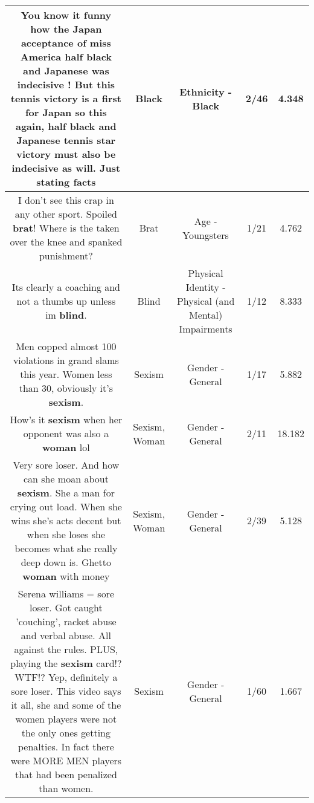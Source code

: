 \documentclass[11pt]{article}
\newlength\mylength
\begin{document}
\begin{center}
\begin{longtable}{|C{.65\mylength}|C{.30\mylength}|C{.12\mylength}|C{.12\mylength}|C{.12\mylength}|}
  \small You know it funny how the Japan acceptance of miss America half \textbf{black} and Japanese was indecisive ! But this tennis victory is a first for Japan so this again, half \textbf{black} and Japanese tennis star victory must also be indecisive as will. Just stating facts\normalsize   & Black & Ethnicity - Black & 2/46 & 4.348 \\  \hline
  \small I don't see this crap in any other sport.  Spoiled \textbf{brat}!  Where is the taken over the knee and spanked punishment?\normalsize   & Brat & Age - Youngsters & 1/21 & 4.762 \\  \hline
  \small Its clearly a coaching and not a thumbs up unless im \textbf{blind}.\normalsize   & Blind & Physical Identity - Physical (and Mental) Impairments & 1/12 & 8.333 \\  \hline
  \small Men copped almost 100 violations in grand slams this year. Women less than 30, obviously it's \textbf{sexism}.\normalsize   & Sexism & Gender - General & 1/17 & 5.882 \\  \hline
  \small How's it \textbf{sexism} when her opponent was also a \textbf{woman} lol\normalsize   & Sexism, Woman & Gender - General & 2/11 & 18.182 \\  \hline
  \small Very sore loser. And how can she moan about \textbf{sexism}. She a man for crying out load. When she wins she's acts decent but when she loses she becomes what she really deep down is. Ghetto \textbf{woman} with money\normalsize   & Sexism, Woman & Gender - General & 2/39 & 5.128 \\  \hline
  \small Serena williams = sore loser. Got caught 'couching', racket abuse and verbal abuse. All against the rules. PLUS, playing the \textbf{sexism} card!? WTF!? Yep, definitely a sore loser. This video says it all, she and some of the women players were not the only ones getting penalties. In fact there were MORE MEN players that had been penalized than women.\normalsize   & Sexism & Gender - General & 1/60 & 1.667 \\  \hline

\end{longtable}
\end{center}
\end{document}
